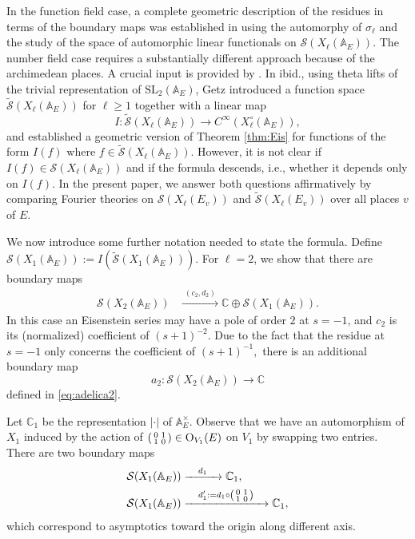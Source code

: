 \documentclass[11pt,a4paper,reqno]{amsart}
\theoremstyle{remark}
\numberwithin{equation}{section}
\newcommand{\A}{\mathbb{A}}
\newcommand{\SL}{\mathrm{SL}}
\newcommand{\CC}{\mathbb{C}}
\theoremstyle{definition}
\numberwithin{equation}{section}
\newenvironment{psmatrix}
  {\left(\begin{smallmatrix}}
  {\end{smallmatrix}\right)}
\begin{document}
 In the function field case, a complete geometric description of the residues in terms of the boundary maps was established in \cite{GK:auto} using the automorphy of $\sigma_\ell$ and the study of the space of automorphic linear functionals on $\mathcal{S}(X_\ell(\A_E)).$ The number field case requires a substantially different approach because of the archimedean places. A crucial input is provided by \cite{Getz:Quad}. In ibid., using theta lifts of the trivial representation of $\SL_2(\A_E)$, Getz introduced a function space $\widetilde{\mathcal{S}}(X_\ell(\A_E))$ for $\ell\ge 1$ together with a linear map $$I:\widetilde{\mathcal{S}}(X_\ell(\A_E))\longrightarrow C^\infty(X_\ell^\circ(\A_E)),$$ and established a geometric version of Theorem \ref{thm:Eis} for functions of the form $I(f)$ where $f\in \widetilde{\mathcal{S}}(X_\ell(\A_E))$. However, it is not clear if $I(f)\in \mathcal{S}(X_\ell(\A_E))$ and if the formula descends, i.e., whether it depends only on $I(f)$. In the present paper, we answer both questions affirmatively by comparing Fourier theories on $\mathcal{S}(X_\ell(E_v))$ and $\widetilde{\mathcal{S}}(X_\ell(E_v))$ over all places $v$ of $E$.

We now introduce some further notation needed to state the formula. Define $\mathcal{S}(X_1(\A_E)):=I(\widetilde{\mathcal{S}}(X_1(\A_E))).$ For $\ell= 2$, we show that there are boundary maps 
\begin{align*}
    \mathcal{S}(X_2(\mathbb{A}_E))&\xrightarrow{\,\,(c_2,d_2)\,\,} \CC\oplus\mathcal{S}(X_{1}(\A_E)).
\end{align*}
In this case an Eisenstein series may have a pole of order $2$ at $s=-1$, and $c_2$ is its (normalized) coefficient of $(s+1)^{-2}$. Due to the fact that the residue at $s=-1$ only concerns the coefficient of $(s+1)^{-1},$ there is an additional boundary map
$$a_2:\mathcal{S}(X_2(\A_E))\longrightarrow\CC$$ 
defined in \eqref{eq:adelica2}. 

Let $\CC_1$ be the representation $|\cdot|$ of $\mathbb{A}_E^\times.$ Observe that we have an automorphism of $X_1$ induced by the action of $\begin{psmatrix}
    0 & 1\\
    1 & 0
\end{psmatrix}\in \mathrm{O}_{V_1}(E)$ on $V_1$ by swapping two entries. There are two boundary maps 
\begin{align*}
    \mathcal{S}(X_{1}(\A_E))&\xrightarrow{\quad d_1\quad} \CC_1,\\
    \mathcal{S}(X_{1}(\A_E))&\xrightarrow{\quad d_1':=d_1\circ \begin{psmatrix}
    0 & 1\\
    1 & 0
\end{psmatrix}\quad} \CC_1,
\end{align*}
which correspond to asymptotics toward the origin along different axis.
\end{document}
